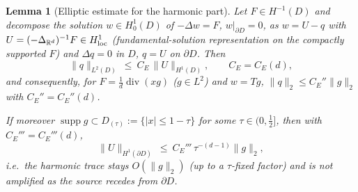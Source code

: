 \documentclass[11pt]{article}
\newtheorem{lemma}[theorem]{Lemma}
\theoremstyle{remark}
\newcommand{\R}{\mathbb{R}}
\newcommand{\norm}[1]{\lVert #1\rVert}
\newcommand{\abs}[1]{\lvert #1\rvert}
\newcommand{\SET}[1]{\{#1\}}
\DeclareMathOperator{\diver}{div}
\DeclareMathOperator{\supp}{supp}
\begin{document}
\begin{lemma}[Elliptic estimate for the harmonic
part]\label{lem:harmonic}
Let $F\in H^{-1}(D)$ and decompose the solution $w\in H^{1}_{0}(D)$ of
$-\Delta w=F$, $w|_{\partial D}=0$, as $w=U-q$ with
$U=(-\Delta_{\R^{d}})^{-1}F\in H^{1}_{\rm loc}$ (fundamental-solution
representation on the compactly supported $F$) and $\Delta q=0$ in $D$,
$q=U$ on $\partial D$. Then
\[
\norm{q}_{L^{2}(D)}\ \le\ C_{E}\,\norm{U}_{H^{1}(D)},
\qquad C_E=C_E(d),
\]
and consequently, for $F=\frac1d\diver(xg)$ ($g\in L^{2}$) and
$w=Tg$,
$\norm{q}_{2}\le C_E''\norm{g}_{2}$ with $C_E''=C_E''(d)$.

\noindent If moreover $\supp g\subset D_{(\tau)}:=\SET{\abs x\le1-\tau}$
for some $\tau\in(0,\tfrac12]$, then with $C_E'''=C_E'''(d)$,
\[
\norm{U}_{H^{1}(\partial D)}\ \le\ C_E'''\,\tau^{-(d-1)}\norm{g}_2 ,
\]
i.e.\ the harmonic trace stays $O(\norm g_2)$ (up to a
$\tau$-\emph{fixed} factor) and is not amplified as the source recedes from
$\partial D$.
\end{lemma}
\end{document}
